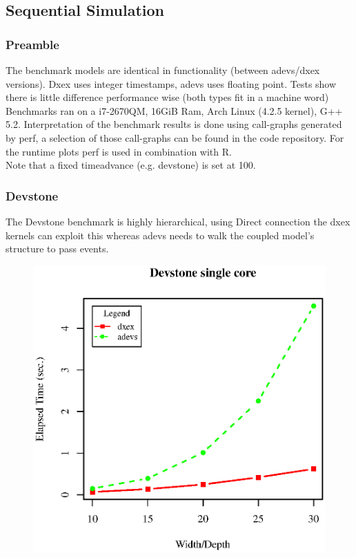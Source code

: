 \subsection{Sequential Simulation}
\subsubsection{Preamble}
The benchmark models are identical in functionality (between adevs/dxex versions). Dxex uses integer timestamps, adevs uses floating point. Tests show there is little difference performance wise (both types fit in a machine word)\\
Benchmarks ran on a i7-2670QM, 16GiB Ram, Arch Linux (4.2.5 kernel), G++ 5.2. Interpretation of the benchmark results is done using call-graphs generated by perf, a selection of those call-graphs can be found in the code repository. For the runtime plots perf is used in combination with R.\\
Note that a fixed timeadvance (e.g. devstone) is set at 100.
\subsubsection{Devstone}
The Devstone \cite{DEVStone} benchmark is highly hierarchical, using Direct connection the dxex kernels can exploit this whereas adevs needs to walk the coupled model's structure to pass events.\\
\begin{figure}[h]
	\includegraphics[width=.5\textwidth]{fig/fig1.eps}
	\label{fig1.eps}
\end{figure}

